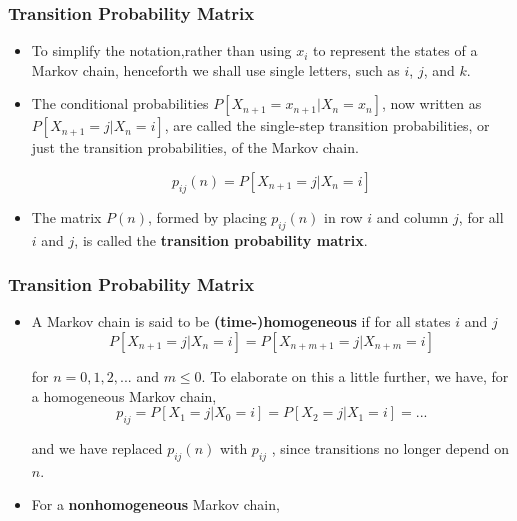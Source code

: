 \begin{frame}
    \frametitle{Transition Probability Matrix}
    \begin{itemize}
        \item To simplify the notation,rather than using $x_i$ to represent the states of a Markov chain, 
        henceforth we shall use single letters, such as $i$, $j$, and $k$.

        \item The conditional probabilities $P[X_{n+1} = x_{n+1}|X_n = x_n]$, now written 
        as $P[X_{n+1} = j|X_n = i]$, are called the single-step transition probabilities, or 
        just the transition probabilities, of the Markov chain.

        $$p_{ij}(n) = P[X_{n+1} = j|X_n = i]$$

        \item The matrix $P(n)$, formed by placing $p_{ij}(n)$ in row $i$ and column $j$, for all $i$ and $j$, is called the
        \textbf{transition probability matrix}.

    \end{itemize}
\end{frame}



\begin{frame}
    \frametitle{Transition Probability Matrix}
    \begin{itemize}
        \item A Markov chain is said to be \textbf{(time-)homogeneous} if for all states $i$ and $j$
        \small
        $$P[X_{n+1} = j|X_n = i] = P[X_{n+m+1} = j|X_{n+m} = i]$$

        for $n = 0,1,2,...$ and $m\leq 0$. To elaborate on this a little further, we have, for a 
        homogeneous Markov chain,
        \small
        $$p_{ij} = P[X_1=j|X_0=i] = P[X_2=j|X_1=i] = ...$$

        and we have replaced $p_{ij}(n)$ with $p_{ij}$ , since transitions no longer depend on $n$.

        \item For a \textbf{nonhomogeneous} Markov chain,

    \end{itemize}
\end{frame}


